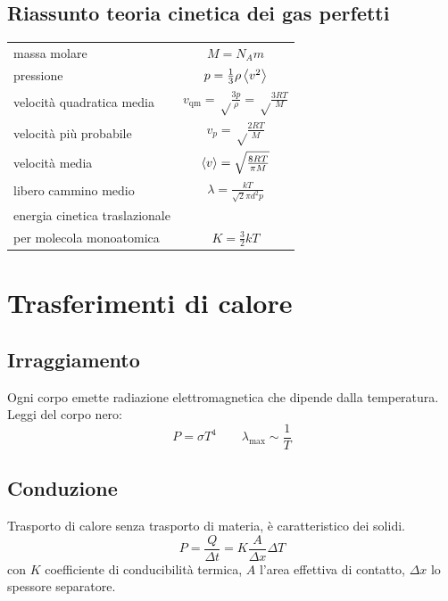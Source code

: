 \subsection{Riassunto teoria cinetica dei gas perfetti}
\begin{tabular}{lc}
   massa molare              & $M=N_A m$                                             \\
   pressione                 & $p=\frac{1}{3}\rho\left<v^2\right>$                        \\
   velocità quadratica media & $v_\text{qm}=\sqrt\frac{3p}{\rho}=\sqrt\frac{3RT}{M}$ \\
   velocità più probabile    & $v_p=\sqrt\frac{2RT}{M}$                              \\
   velocità media            & $\left<v\right>=\sqrt\frac{8RT}{\pi M}$                    \\
   libero cammino medio      & $\lambda=\frac{kT}{\sqrt{2}\pi d^2p}$                 \\
   energia cinetica traslazionale                                                    \\per molecola monoatomica&$K=\frac{3}{2}kT$\\
\end{tabular}



\section{Trasferimenti di calore}
\subsection{Irraggiamento}
Ogni corpo emette radiazione elettromagnetica che dipende dalla temperatura. Leggi del corpo nero:
\begin{equation}P=\sigma T^4\qquad \lambda_\text{max}\sim\frac{1}{T}\end{equation}

\subsection{Conduzione}
Trasporto di calore senza trasporto di materia, è caratteristico dei solidi.
\begin{equation}
   P=\frac{Q}{\Delta t}=K\frac{A}{\Delta x}\Delta T
\end{equation}
con $K$ coefficiente di conducibilità termica, $A$ l'area effettiva di contatto, $\Delta x$ lo spessore separatore.

